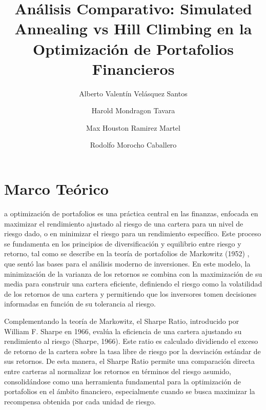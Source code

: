 \documentclass[9pt,a4paper,twoside]{rho-class/rho}
\title{ Análisis Comparativo: Simulated Annealing vs Hill Climbing en la Optimización de Portafolios Financieros }
\author[,$\dagger$]{Alberto Valentín Velásquez Santos}
\author[,$\dagger$]{Harold Mondragon Tavara}
\author[,$\dagger$]{Max Houston Ramirez Martel}
\author[,$\dagger$]{Rodolfo Morocho Caballero}
\affil[$\dagger$]{Estos autores contribuyeron igualmente a este trabajo.}
\begin{document}
	
    \maketitle
    \section{Marco Teórico}

        a optimización de portafolios es una práctica central en las finanzas, enfocada en maximizar el rendimiento ajustado al riesgo de una cartera para un nivel de riesgo dado, o en minimizar el riesgo para un rendimiento específico. Este proceso se fundamenta en los principios de diversificación y equilibrio entre riesgo y retorno, tal como se describe en la teoría de portafolios de Markowitz (1952) \cite{Markowitz1952}, que sentó las bases para el análisis moderno de inversiones. En este modelo, la minimización de la varianza de los retornos se combina con la maximización de su media para construir una cartera eficiente, definiendo el riesgo como la volatilidad de los retornos de una cartera y permitiendo que los inversores tomen decisiones informadas en función de su tolerancia al riesgo.

        Complementando la teoría de Markowitz, el Sharpe Ratio, introducido por William F. Sharpe en 1966, evalúa la eficiencia de una cartera ajustando su rendimiento al riesgo (Sharpe, 1966)\cite{Sharpe1966}. Este ratio es calculado dividiendo el exceso de retorno de la cartera sobre la tasa libre de riesgo por la desviación estándar de sus retornos. De esta manera, el Sharpe Ratio permite una comparación directa entre carteras al normalizar los retornos en términos del riesgo asumido, consolidándose como una herramienta fundamental para la optimización de portafolios en el ámbito financiero, especialmente cuando se busca maximizar la recompensa obtenida por cada unidad de riesgo.
        
\end{document}

